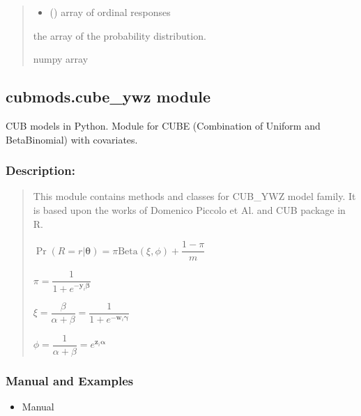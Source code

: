 \documentclass[letterpaper,10pt,english]{sphinxmanual}
\begin{document}
\begin{fulllineitems}
\begin{quote}
\begin{description}
\begin{itemize}
\item {} 
\sphinxAtStartPar
{} () \textendash{} array of ordinal responses

\end{itemize}

\sphinxAtStartPar
the array of the probability distribution.

\sphinxAtStartPar
numpy array

\end{description}\end{quote}

\end{fulllineitems}



\subsection{cubmods.cube\_ywz module}
\label{\detokenize{cubmods:module-cubmods.cube_ywz}}\label{\detokenize{cubmods:cubmods-cube-ywz-module}}
\sphinxAtStartPar
CUB models in Python.
Module for CUBE (Combination of Uniform
and Beta\sphinxhyphen{}Binomial) with covariates.


\subsubsection{Description:}
\label{\detokenize{cubmods:id100}}\begin{quote}

\sphinxAtStartPar
This module contains methods and classes
for CUB\_YWZ model family.
It is based upon the works of Domenico
Piccolo et Al. and CUB package in R.

\sphinxAtStartPar
\(\Pr(R=r|\pmb{\theta}) = \pi \mathrm{Beta}(\xi,\phi)+\dfrac{1-\pi}{m}\)

\sphinxAtStartPar
\(\pi = \dfrac{1}{1+e^{-\pmb y_i \pmb \beta}}\)

\sphinxAtStartPar
\(\xi = \dfrac{\beta}{\alpha+\beta} = \dfrac{1}{1+e^{-\pmb w_i \pmb \gamma}}\)

\sphinxAtStartPar
\(\phi = \dfrac{1}{\alpha+\beta} = e^{\pmb z_i \pmb \alpha}\)
\end{quote}


\subsubsection{Manual and Examples}
\label{\detokenize{cubmods:id101}}\begin{itemize}
\item {} 
\sphinxAtStartPar
Manual 

\end{itemize}
\end{document}
